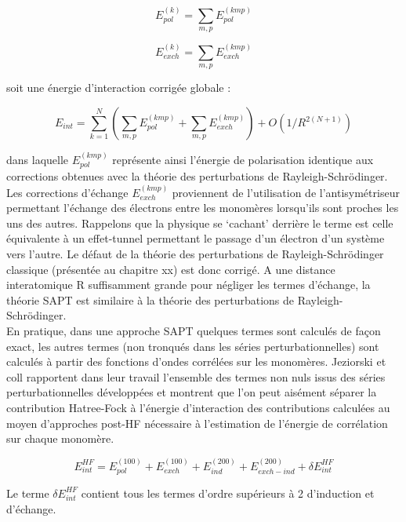 \begin{equation}
E_{pol}^{(k)} = \sum_{m,p} E_{pol}^{(kmp)}
\end{equation}
   		
\begin{equation}
E_{exch}^{(k)} = \sum_{m,p} E_{exch}^{(kmp)}
\end{equation}
   		
soit une énergie d’interaction corrigée globale :
   		
\begin{equation}
E_{int} = \sum_{k=1}^{N} ( \sum_{m,p} E_{pol}^{(kmp)} + \sum_{m,p} E_{exch}^{(kmp)} ) + O(1/R^{2 (N+1)})
\end{equation}
   		
dans laquelle $E_{pol}^{(kmp)}$ représente ainsi l'énergie de polarisation identique aux corrections obtenues avec la théorie des perturbations de Rayleigh-Schr\"{o}dinger. Les corrections d'échange $E_{exch}^{(kmp)}$ proviennent de l'utilisation de l'antisymétriseur permettant l'échange des électrons entre les monomères lorsqu'ils sont proches les uns des autres. Rappelons que la physique se ‘cachant’ derrière le terme est celle équivalente à un effet-tunnel permettant le passage d’un électron d’un système vers l’autre. Le défaut de la théorie des perturbations de Rayleigh-Schr\"{o}dinger classique (présentée au chapitre xx) est donc corrigé. A une distance interatomique R suffisamment grande pour négliger les termes d'échange, la théorie SAPT est similaire à la théorie des perturbations de Rayleigh-Schr\"{o}dinger.\\
   				
En pratique, dans une approche SAPT quelques termes sont calculés de façon exact, les autres termes (non tronqués dans les séries perturbationnelles) sont calculés à partir des fonctions d’ondes corrélées sur les monomères. Jeziorski et coll rapportent dans leur travail l’ensemble des termes non nuls issus des séries perturbationnelles développées et montrent que l’on peut aisément séparer la contribution Hatree-Fock à l’énergie d’interaction des contributions calculées au moyen d’approches post-HF nécessaire à l’estimation de l’énergie de corrélation sur chaque monomère. 
   				
\begin{equation}
E_{int}^{HF} =  E_{pol}^{(100)} + E_{exch}^{(100)} + E_{ind}^{(200)} + E_{exch-ind}^{(200)} + \delta E_{int}^{HF}
\end{equation}
   				
Le terme $\delta E_{int}^{HF}$ contient tous les termes d’ordre supérieurs à 2 d’induction et d’échange.
   				
